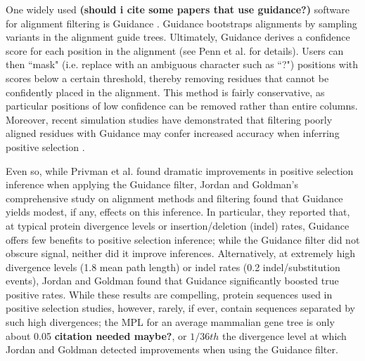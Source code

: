 \documentclass[10pt]{article}
\begin{document}
One widely used \textbf{(should i cite some papers that use guidance?)} software for alignment filtering is Guidance \citep{Penn2010}. Guidance bootstraps alignments by sampling variants in the alignment guide trees. Ultimately, Guidance derives a confidence score for each position in the alignment (see Penn et al. for details). Users can then ``mask" (i.e. replace with an ambiguous character such as ``?") positions with scores below a certain threshold, thereby removing residues that cannot be confidently placed in the alignment. This method is fairly conservative, as particular positions of low confidence can be removed rather than entire columns. Moreover, recent simulation studies have demonstrated that filtering poorly aligned residues with Guidance may confer increased accuracy when inferring positive selection \citep{Jordan2011,Privman2012}. 

Even so, while Privman et al. \citep{Privman2012} found dramatic improvements in positive selection inference when applying the Guidance filter, Jordan and Goldman's \citep{Jordan2011} comprehensive study on alignment methods and filtering found that Guidance yields modest, if any, effects on this inference. In particular, they reported that, at typical protein divergence levels or insertion/deletion (indel) rates, Guidance offers few benefits to positive selection inference; while the Guidance filter did not obscure signal, neither did it improve inferences. Alternatively, at extremely high divergence levels (1.8 mean path length) or indel rates (0.2 indel/substitution events), Jordan and Goldman found that Guidance significantly boosted true positive rates. While these results are compelling, protein sequences used in positive selection studies, however, rarely, if ever, contain sequences separated by such high divergences; the MPL for an average mammalian gene tree is only about 0.05 \textbf{citation needed maybe?}, or $1/36th$ the divergence level at which Jordan and Goldman detected improvements when using the Guidance filter.
\end{document}
